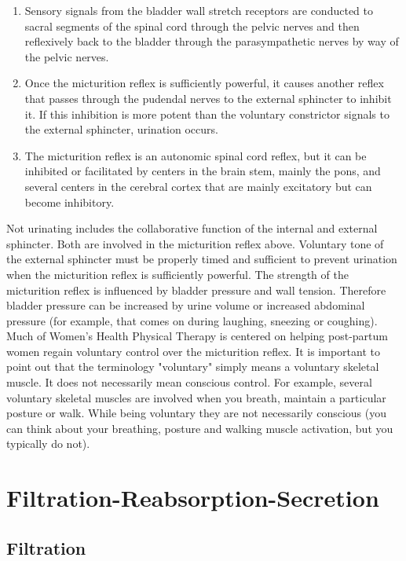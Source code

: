 \begin{enumerate}
    \item Sensory signals from the bladder wall stretch receptors are conducted to sacral segments of the spinal cord through the pelvic nerves and then reflexively back to the bladder through the parasympathetic nerves by way of the pelvic nerves.
    \item  Once the micturition reflex is sufficiently powerful, it causes another reflex that passes through the pudendal nerves to the external sphincter to inhibit it. If this inhibition is more potent than the voluntary constrictor signals to the external sphincter, urination occurs.
    \item  The micturition reflex is an autonomic spinal cord reflex, but it can be inhibited or facilitated by centers in the brain stem, mainly the pons, and several centers in the cerebral cortex that are mainly excitatory but can become inhibitory.
\end{enumerate}

Not urinating includes the collaborative function of the internal and external sphincter. Both are involved in the micturition reflex above. Voluntary tone of the external sphincter must be properly timed and sufficient to prevent urination when the micturition reflex is sufficiently powerful. The strength of the micturition reflex is influenced by bladder pressure and wall tension. Therefore bladder pressure can be increased by urine volume or increased abdominal pressure (for example, that comes on during laughing, sneezing or coughing). Much of Women's Health Physical Therapy is centered on helping post-partum women regain voluntary control over the micturition reflex. It is important to point out that the terminology "voluntary" simply means a voluntary skeletal muscle. It does not necessarily mean conscious control. For example, several voluntary skeletal muscles are involved when you breath, maintain a particular posture or walk.  While being voluntary they are not necessarily conscious (you can think about your breathing, posture and walking muscle activation, but you typically do not).


\section{Filtration-Reabsorption-Secretion}

\subsection{Filtration}

